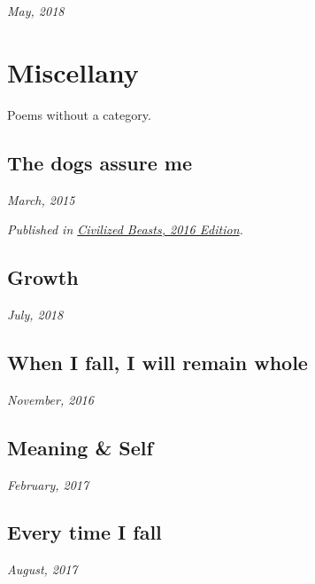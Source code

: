 \documentclass[10pt]{memoir}
\begin{document}
  \hfill\textit{May, 2018}

  
  \newpage


  \chapter{Miscellany}

  Poems without a category.
  \thispagestyle{empty}
  \newpage


  \section{The dogs assure me}

  \hfill\textit{March, 2015}

  

  \textit{Published in \underline{Civilized Beasts, 2016 Edition}.}
  \cleartoverso


  \section{Growth}

  \hfill\textit{July, 2018}

  
  \newpage


  \section{When I fall, I will remain whole}

  \hfill\textit{November, 2016}

  
  \cleartoverso


  \section{Meaning \& Self}

  \hfill\textit{February, 2017}

  
  \newpage

  \section{Every time I fall}

  \hfill\textit{August, 2017}

  
  \newpage
\end{document}
